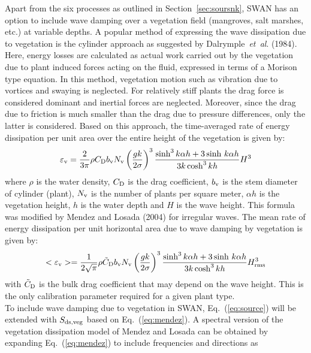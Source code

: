 \documentclass[12pt]{book}
\begin{document}
Apart from the six processes as outlined in Section~\ref{sec:soursnk}, SWAN has an option to include
wave damping over a vegetation field (mangroves, salt marshes, etc.) at variable depths.
A popular method of expressing the wave dissipation due to vegetation is the cylinder approach
as suggested by Dalrymple~{\it et~al}. (1984). Here,
energy losses are calculated as actual work carried out by the vegetation due to plant
induced forces acting on the fluid, expressed in terms of a Morison type equation.
In this method, vegetation motion such as vibration due to vortices and swaying is
neglected. For relatively stiff plants the drag force is considered dominant and inertial
forces are neglected. Moreover, since the drag due to friction is much smaller than the
drag due to pressure differences, only the latter is considered. Based on
this approach, the time-averaged rate of energy dissipation per unit
area over the entire height of the vegetation is given by:
\begin{equation}
  \varepsilon_{\rm v} = \frac{2}{3\pi} \rho C_{\rm D} b_{\rm v} N_{\rm v} \left( \frac{gk}{2\sigma} \right)^3
                 \frac{\sinh^3 k\alpha h + 3\sinh\, k\alpha h}{3k\cosh^3 kh} H^3
\end{equation}
where $\rho$ is the water density, $C_{\rm D}$ is the drag coefficient, $b_{\rm v}$ is the
stem diameter of cylinder (plant), $N_{\rm v}$ is the number of plants per square meter,
$\alpha h$ is the vegetation height, $h$ is the water depth and $H$ is the wave height.
This formula was modified by Mendez and Losada (2004) for irregular waves.
The mean rate of energy dissipation per unit horizontal
area due to wave damping by vegetation is given by:
\begin{equation}
  <\varepsilon_{\rm v}> = \frac{1}{2\sqrt{\pi}} \rho {\tilde C}_{\rm D} b_{\rm v} N_{\rm v} \left( \frac{gk}{2\sigma} \right)^3
                   \frac{\sinh^3 k\alpha h + 3\sinh\, k\alpha h}{3k\cosh^3 kh} H_{\rm rms}^3
  \label{eq:mendez}
\end{equation}
with ${\tilde C}_{\rm D}$ is the bulk drag coefficient that may depend on the wave height. This is the only
calibration parameter required for a given plant type.
\nocite{Dal84KH,Men04L}
\\[2ex]
\noindent
To include wave damping due to vegetation in SWAN, Eq.~(\ref{eq:source}) will be extended with $S_{\rm ds,veg}$ based
on Eq.~(\ref{eq:mendez}). A spectral version of the vegetation dissipation model of Mendez and
Losada can be obtained by expanding Eq.~(\ref{eq:mendez}) to include frequencies and directions as
\end{document}
